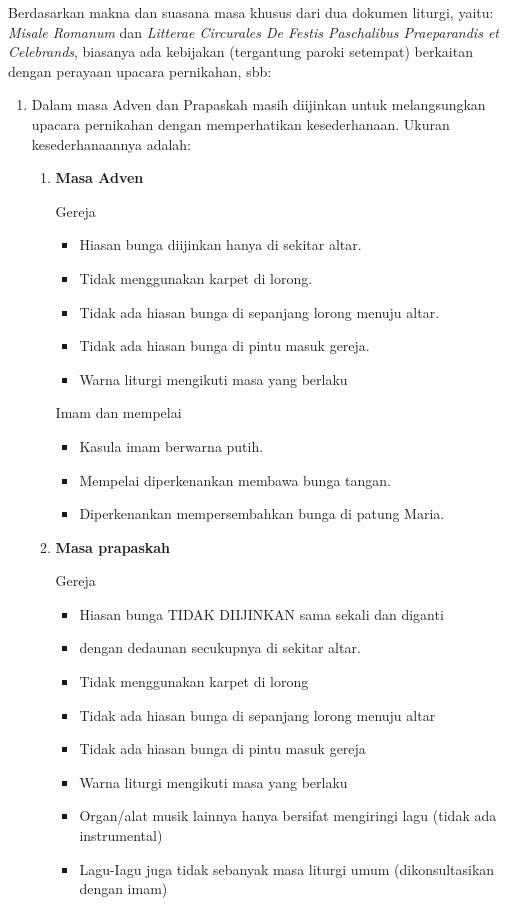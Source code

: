     Berdasarkan makna dan suasana masa khusus dari dua dokumen liturgi, yaitu: \textit{Misale Romanum} dan \textit{Litterae Circurales De Festis Paschalibus Praeparandis et Celebrands}, biasanya ada kebijakan (tergantung paroki setempat) berkaitan dengan perayaan upacara pernikahan, sbb:
\begin{enumerate}
\item    Dalam masa Adven dan Prapaskah masih diijinkan untuk melangsungkan upacara pernikahan dengan memperhatikan kesederhanaan. Ukuran kesederhanaannya adalah:
\begin{enumerate}
\item \textbf{Masa Adven}

    Gereja

\begin{itemize}
\item        Hiasan bunga diijinkan hanya di sekitar altar.
\item        Tidak menggunakan karpet di lorong.
\item        Tidak ada hiasan bunga di sepanjang lorong menuju altar.
\item        Tidak ada hiasan bunga di pintu masuk gereja.
\item        Warna liturgi mengikuti masa yang berlaku
\end{itemize}

    Imam dan mempelai

\begin{itemize}
\item        Kasula imam berwarna putih.
\item        Mempelai diperkenankan membawa bunga tangan.
\item        Diperkenankan mempersembahkan bunga di patung Maria.
\end{itemize}

\item \textbf{Masa prapaskah}

    Gereja

\begin{itemize}
\item        Hiasan bunga TIDAK DIIJINKAN sama sekali dan diganti
\item        dengan dedaunan secukupnya di sekitar altar.
\item        Tidak menggunakan karpet di lorong
\item        Tidak ada hiasan bunga di sepanjang lorong menuju altar
\item        Tidak ada hiasan bunga di pintu masuk gereja
\item        Warna liturgi mengikuti masa yang berlaku
\item        Organ/alat musik lainnya hanya bersifat mengiringi lagu (tidak ada instrumental)
\item        Lagu-Iagu juga tidak sebanyak masa liturgi umum (dikonsultasikan dengan imam)
\end{itemize}


\end{enumerate}
\end{enumerate}
